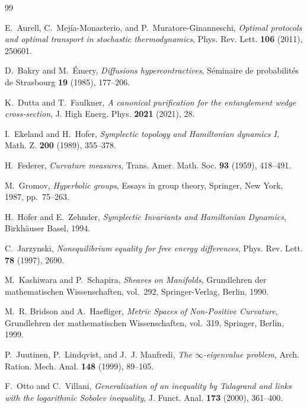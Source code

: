 \documentclass[11pt,a4paper,reqno]{amsart}
\theoremstyle{definition}
\theoremstyle{remark}
\numberwithin{equation}{section}
\begin{document}
\begin{thebibliography}{99}

E.~Aurell, C.~Mej\'ia-Monasterio, and P.~Muratore-Ginanneschi,
\emph{Optimal protocols and optimal transport in stochastic thermodynamics},
Phys. Rev. Lett. \textbf{106} (2011), 250601.

D.~Bakry and M.~\'Emery,
\emph{Diffusions hypercontractives},
S\'eminaire de probabilit\'es de Strasbourg \textbf{19} (1985), 177--206.

K.~Dutta and T.~Faulkner,
\emph{A canonical purification for the entanglement wedge cross-section},
J. High Energ. Phys. \textbf{2021} (2021), 28.

I.~Ekeland and H.~Hofer,
\emph{Symplectic topology and Hamiltonian dynamics I},
Math. Z. \textbf{200} (1989), 355--378.

H.~Federer,
\emph{Curvature measures},
Trans. Amer. Math. Soc. \textbf{93} (1959), 418--491.

M.~Gromov,
\emph{Hyperbolic groups},
Essays in group theory, Springer, New York, 1987, pp.~75--263.

H.~Hofer and E.~Zehnder,
\emph{Symplectic Invariants and Hamiltonian Dynamics},
Birkh\"auser Basel, 1994.

C.~Jarzynski,
\emph{Nonequilibrium equality for free energy differences},
Phys. Rev. Lett. \textbf{78} (1997), 2690.

M.~Kashiwara and P.~Schapira,
\emph{Sheaves on Manifolds},
Grundlehren der mathematischen Wissenschaften, vol.~292, Springer-Verlag, Berlin, 1990.

M.~R. Bridson and A.~Haefliger,
\emph{Metric Spaces of Non-Positive Curvature},
Grundlehren der mathematischen Wissenschaften, vol.~319, Springer, Berlin, 1999.

P.~Juutinen, P.~Lindqvist, and J.~J. Manfredi,
\emph{The $\infty$-eigenvalue problem},
Arch. Ration. Mech. Anal. \textbf{148} (1999), 89--105.

F.~Otto and C.~Villani,
\emph{Generalization of an inequality by Talagrand and links with the logarithmic Sobolev inequality},
J. Funct. Anal. \textbf{173} (2000), 361--400.


\end{thebibliography}
\end{document}
